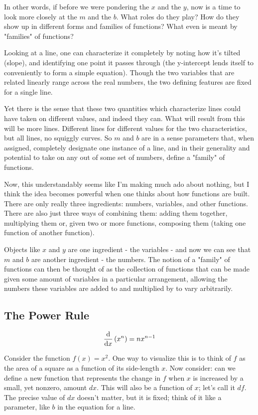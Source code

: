 \documentclass[a4paper]{article}
\begin{document}
In other words, if before we were pondering the $x$ and the $y$, now is a time to look more closely at the $m$ and the $b$. What roles do they play? How do they show up in different forms and families of functions? What even is meant by "families" of functions?

Looking at a line, one can characterize it completely by noting how it's tilted (slope), and identifying one point it passes through (the y-intercept lends itself to conveniently to form a simple equation). Though the two variables that are related linearly range across the real numbers, the two defining features are fixed for a single line.

Yet there is the sense that these two quantities which characterize lines could have taken on different values, and indeed they can. What will result from this will be more lines. Different lines for different values for the two characteristics, but all lines, no squiggly curves. So $m$ and $b$ are in a sense parameters that, when assigned, completely designate one instance of a line, and in their generality and potential to take on any out of some set of numbers, define a "family" of functions.

Now, this understandably seems like I'm making much ado about nothing, but I think the idea becomes powerful when one thinks about how functions are built. There are only really three ingredients: numbers, variables, and other functions. There are also just three ways of combining them: adding them together, multiplying them or, given two or more functions, composing them (taking one function of another function). 

Objects like $x$ and $y$ are one ingredient - the variables - and now we can see that $m$ and $b$ are another ingredient - the numbers. The notion of a "family" of functions can then be thought of as the collection of functions that can be made given some amount of variables in a particular arrangement, allowing the numbers these variables are added to and multiplied by to vary arbitrarily.

\subsection{The Power Rule}

$$ \dv{}{x}\left(x^n\right)  = nx^{n-1} $$

Consider the function $f(x)=x^2$. One way to visualize this is to think of $f$ as the area of a square as a function of its side-length $x$. Now consider: can we define a new function that represents the change in $f$ when $x$ is increased by a small, yet nonzero, amount $dx$. This will also be a function of $x$; let's call it $df$. The precise value of $dx$ doesn't matter, but it is fixed; think of it like a parameter, like $b$ in the equation for a line.
\end{document}
